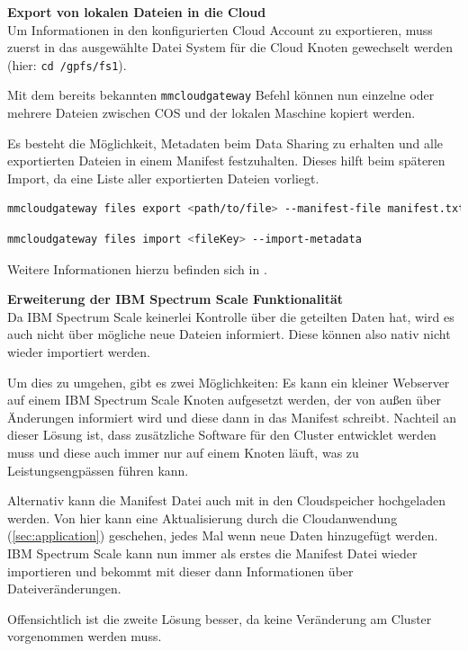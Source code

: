 \textbf{Export von lokalen Dateien in die Cloud}\\
Um Informationen in den konfigurierten Cloud Account zu exportieren, muss zuerst in das ausgewählte Datei System für die Cloud Knoten gewechselt werden (hier: \lstinline|cd /gpfs/fs1|).

Mit dem bereits bekannten \lstinline|mmcloudgateway| Befehl können nun einzelne oder mehrere Dateien zwischen \ac{COS} und der lokalen Maschine kopiert werden.

Es besteht die Möglichkeit, Metadaten beim Data Sharing zu erhalten und alle exportierten Dateien in einem Manifest festzuhalten. Dieses hilft beim späteren Import, da eine Liste aller exportierten Dateien vorliegt. 

\begin{lstlisting}[language=bash, caption=Export von lokalen Dateien]
mmcloudgateway files export <path/to/file> --manifest-file manifest.txt --export-metadata
\end{lstlisting}

\begin{lstlisting}[language=bash, caption=Import von COS Dateien]
mmcloudgateway files import <fileKey> --import-metadata
\end{lstlisting}

Weitere Informationen hierzu befinden sich in \cite[S. 613]{scale.2017}.

\textbf{Erweiterung der IBM Spectrum Scale Funktionalität}\\
Da IBM Spectrum Scale keinerlei Kontrolle über die geteilten Daten hat, wird es auch nicht über mögliche neue Dateien informiert. Diese können also nativ nicht wieder importiert werden.

Um dies zu umgehen, gibt es zwei Möglichkeiten: Es kann ein kleiner Webserver auf einem IBM Spectrum Scale Knoten aufgesetzt werden, der von außen über Änderungen informiert wird und diese dann in das Manifest schreibt. Nachteil an dieser Lösung ist, dass zusätzliche Software für den Cluster entwicklet werden muss und diese auch immer nur auf einem Knoten läuft, was zu Leistungsengpässen führen kann.

Alternativ kann die Manifest Datei auch mit in den Cloudspeicher hochgeladen werden. Von hier kann eine Aktualisierung durch die Cloudanwendung (\autoref{sec:application}) geschehen, jedes Mal wenn neue Daten hinzugefügt werden. IBM Spectrum Scale kann nun immer als erstes die Manifest Datei wieder importieren und bekommt mit dieser dann Informationen über Dateiveränderungen.

Offensichtlich ist die zweite Lösung besser, da keine Veränderung am Cluster vorgenommen werden muss.